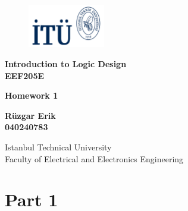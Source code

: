 \documentclass{article}
\begin{document}
\begin{titlepage}
    \begin{figure}[h] %
        \begin{flushright}
        \includegraphics[width=0.3\textwidth]{logo_laci.png} %
            
        \end{flushright}
        \hfill
    \end{figure}

    \centering
    \vspace*{1in}
    
    \Huge
    \textbf{Introduction to Logic Design} \\
    \textbf{EEF205E} \\

    \vspace{0.5in}

    \Large
    \textbf{Homework 1} \\
    
    \vspace{0.5in}

    \large
    \textbf{Rüzgar Erik} \\
    \textbf{040240783} \\

    \vspace{0.5in}
    
    \Large
    Istanbul Technical University \\
    Faculty of Electrical and Electronics Engineering \\
    
    \vfill


\end{titlepage}


\section*{Part 1}
\end{document}
